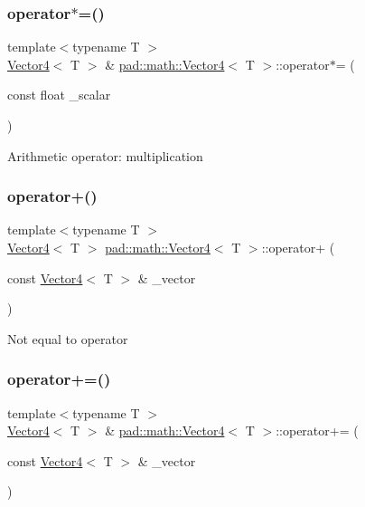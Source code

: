 \subsubsection{\texorpdfstring{operator$\ast$=()}{operator*=()}}
{\footnotesize\ttfamily template$<$typename T $>$ \\
\mbox{\hyperlink{structpad_1_1math_1_1_vector4}{Vector4}}$<$ T $>$ \& \mbox{\hyperlink{structpad_1_1math_1_1_vector4}{pad\+::math\+::\+Vector4}}$<$ T $>$\+::operator$\ast$= (\begin{DoxyParamCaption}\item[{const float}]{\+\_\+scalar }\end{DoxyParamCaption})}

Arithmetic operator\+: multiplication \mbox{\label{structpad_1_1math_1_1_vector4_ac6b2370ae62f75e3dcb112427e3f518f}} 
\subsubsection{\texorpdfstring{operator+()}{operator+()}}
{\footnotesize\ttfamily template$<$typename T $>$ \\
\mbox{\hyperlink{structpad_1_1math_1_1_vector4}{Vector4}}$<$ T $>$ \mbox{\hyperlink{structpad_1_1math_1_1_vector4}{pad\+::math\+::\+Vector4}}$<$ T $>$\+::operator+ (\begin{DoxyParamCaption}\item[{const \mbox{\hyperlink{structpad_1_1math_1_1_vector4}{Vector4}}$<$ T $>$ \&}]{\+\_\+vector }\end{DoxyParamCaption})}

Not equal to operator \mbox{\label{structpad_1_1math_1_1_vector4_aed8f9c0faacfe13f7985d5f4e4f73d23}} 
\subsubsection{\texorpdfstring{operator+=()}{operator+=()}}
{\footnotesize\ttfamily template$<$typename T $>$ \\
\mbox{\hyperlink{structpad_1_1math_1_1_vector4}{Vector4}}$<$ T $>$ \& \mbox{\hyperlink{structpad_1_1math_1_1_vector4}{pad\+::math\+::\+Vector4}}$<$ T $>$\+::operator+= (\begin{DoxyParamCaption}\item[{const \mbox{\hyperlink{structpad_1_1math_1_1_vector4}{Vector4}}$<$ T $>$ \&}]{\+\_\+vector }\end{DoxyParamCaption})}

